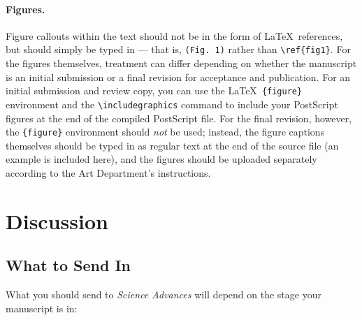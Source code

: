 \documentclass[12pt]{article}
\begin{document}
\paragraph*{Figures.}  Figure callouts within the text should not be
in the form of \LaTeX\ references, but should simply be typed in ---
that is, \verb+(Fig. 1)+ rather than \verb+\ref{fig1}+.  For the
figures themselves, treatment can differ depending on whether the
manuscript is an initial submission or a final revision for acceptance
and publication.  For an initial submission and review copy, you can
use the \LaTeX\ \verb+{figure}+ environment and the
\verb+\includegraphics+ command to include your PostScript figures at
the end of the compiled PostScript file.  For the final revision,
however, the \verb+{figure}+ environment should {\it not\/} be used;
instead, the figure captions themselves should be typed in as regular
text at the end of the source file (an example is included here), and
the figures should be uploaded separately according to the Art
Department's instructions.




\section*{Discussion}

\subsection*{What to Send In}

What you should send to {\it Science Advances\/} will depend on the stage your manuscript is in:
\end{document}
